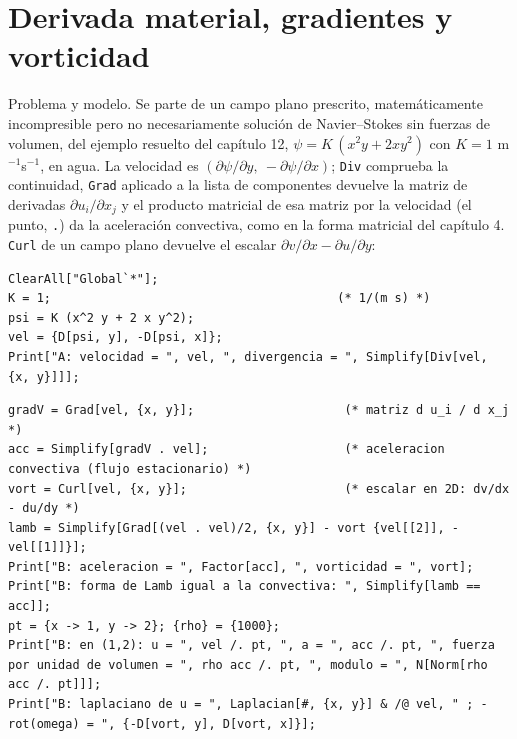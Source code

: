 \documentclass[10pt,openany]{book}
\begin{document}
\section{Derivada material, gradientes y vorticidad}

Problema y modelo. Se parte de un campo plano prescrito, matemáticamente incompresible pero no necesariamente solución de Navier--Stokes sin fuerzas de volumen, del ejemplo resuelto del capítulo 12, \(\psi = K\,(x^{2}y + 2xy^{2})\) con \(K = 1\) m\(^{-1}\)s\(^{-1}\), en agua. La velocidad es \((\partial\psi/\partial y,\ -\partial\psi/\partial x)\); \texttt{Div} comprueba la continuidad, \texttt{Grad} aplicado a la lista de componentes devuelve la matriz de derivadas \(\partial u_i/\partial x_j\) y el producto matricial de esa matriz por la velocidad (el punto, \texttt{.}) da la aceleración convectiva, como en la forma matricial del capítulo 4. \texttt{Curl} de un campo plano devuelve el escalar \(\partial v/\partial x - \partial u/\partial y\):
\begin{lstlisting}[style=studium]
ClearAll["Global`*"];
K = 1;                                        (* 1/(m s) *)
psi = K (x^2 y + 2 x y^2);
vel = {D[psi, y], -D[psi, x]};
Print["A: velocidad = ", vel, ", divergencia = ", Simplify[Div[vel, {x, y}]]];
\end{lstlisting}
\begin{lstlisting}[style=studium]
gradV = Grad[vel, {x, y}];                     (* matriz d u_i / d x_j *)
acc = Simplify[gradV . vel];                   (* aceleracion convectiva (flujo estacionario) *)
vort = Curl[vel, {x, y}];                      (* escalar en 2D: dv/dx - du/dy *)
lamb = Simplify[Grad[(vel . vel)/2, {x, y}] - vort {vel[[2]], -vel[[1]]}];
Print["B: aceleracion = ", Factor[acc], ", vorticidad = ", vort];
Print["B: forma de Lamb igual a la convectiva: ", Simplify[lamb == acc]];
pt = {x -> 1, y -> 2}; {rho} = {1000};
Print["B: en (1,2): u = ", vel /. pt, ", a = ", acc /. pt, ", fuerza por unidad de volumen = ", rho acc /. pt, ", modulo = ", N[Norm[rho acc /. pt]]];
Print["B: laplaciano de u = ", Laplacian[#, {x, y}] & /@ vel, " ; -rot(omega) = ", {-D[vort, y], D[vort, x]}];
\end{lstlisting}
\end{document}
